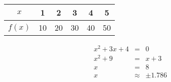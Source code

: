 \documentclass{article}
\begin{document}
	\begin{tabular}{|c|c|c|c|c|c|}
		\hline
		$x$ & 1 & 2 & 3 & 4 & 5\\ \hline
		$f(x)$ & 10 & 20 & 30 & 40 & 50 \\ \hline
	\end{tabular}
	\begin{eqnarray} %
	x^2+3x+4&=&0\\	%
	x^2+9&=&x+3\\
	x&=&8\\
	x&\approx&\pm1.786
	\end{eqnarray}
\end{document}
